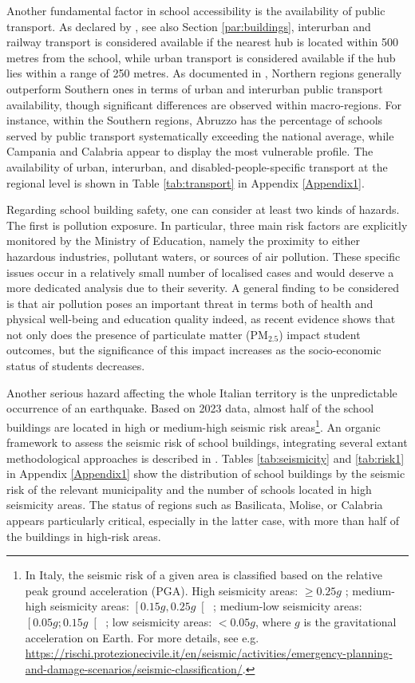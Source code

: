 \documentclass[openany, 11pt, oneside]{book}
\begin{document}
Another fundamental factor in school accessibility is the availability of public transport. As declared by \cite{MIUR}, see also Section \ref{par:buildings}, interurban and railway transport is considered available if the nearest hub is located within 500 metres from the school, while urban transport is considered available if the hub lies within a range of 250 metres. As documented in \cite{Garlaschi}, Northern regions generally outperform Southern ones in terms of urban and interurban public transport availability, though significant differences are observed within macro-regions. For instance, within the Southern regions, Abruzzo has the percentage of schools served by public transport systematically exceeding the national average, while Campania and Calabria appear to display the most vulnerable profile. The availability of urban, interurban, and disabled-people-specific transport at the regional level is shown in Table \ref{tab:transport} in Appendix \ref{Appendix1}.

Regarding school building safety, one can consider at least two kinds of hazards. The first is pollution exposure. In particular, three main risk factors are explicitly monitored by the Ministry of Education, namely the proximity to either hazardous industries, pollutant waters, or sources of air pollution. These specific issues occur in a relatively small number of localised cases and would deserve a more dedicated analysis due to their severity. A general finding to be considered is that air pollution poses an important threat in terms both of health and physical well-being and education quality indeed, as recent evidence \parencite{AQInvalsi} shows that not only does the presence of particulate matter (PM$_{2.5}$)  impact student outcomes, but the significance of this impact increases as the socio-economic status of students decreases.

Another serious hazard affecting the whole Italian territory is the unpredictable occurrence of an earthquake. Based on 2023 data, almost half of the school buildings are located in high or medium-high seismic risk areas\footnote{In Italy, the seismic risk of a given area is classified based on the relative peak ground acceleration (PGA). High seismicity areas: $\geq 0.25 g$ ; medium-high seismicity areas: $\left[ 0.15g, 0.25 g \right[$ ; medium-low seismicity areas: $\left[ 0.05g; 0.15 g \right[$ ; low seismicity areas: $< 0.05 g$, where $g$ is the gravitational acceleration on Earth. For more details, see e.g. \url{https://rischi.protezionecivile.it/en/seismic/activities/emergency-planning-and-damage-scenarios/seismic-classification/}.}. An organic framework to assess the seismic risk of school buildings, integrating several extant methodological approaches is described in \cite{MARS}. Tables \ref{tab:seismicity} and \ref{tab:risk1} in Appendix \ref{Appendix1} show the distribution of school buildings by the seismic risk of the relevant municipality and the number of schools located in high seismicity areas. The status of regions such as Basilicata, Molise, or Calabria appears particularly critical, especially in the latter case, with more than half of the buildings in high-risk areas. 
\end{document}
